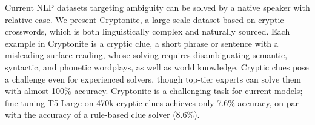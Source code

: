 Current NLP datasets targeting ambiguity can be solved by a native speaker with relative ease. We present Cryptonite, a large-scale dataset based on cryptic crosswords, which is both linguistically complex and naturally sourced. Each example in Cryptonite is a cryptic clue, a short phrase or sentence with a misleading surface reading, whose solving requires disambiguating semantic, syntactic, and phonetic wordplays, as well as world knowledge. Cryptic clues pose a challenge even for experienced solvers, though top-tier experts can solve them with almost 100\% accuracy. Cryptonite is a challenging task for current models; fine-tuning T5-Large on 470k cryptic clues achieves only 7.6\% accuracy, on par with the accuracy of a rule-based clue solver (8.6\%).
